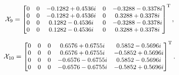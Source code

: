 \documentclass[journal]{IEEEtran}
\begin{document}
\begin{equation}
  \footnotesize   
     \mathcal X_9=
\begin{bmatrix}
   0&  0& -0.1282 + 0.4536i&  0& -0.3288 - 0.3378i\\
   0&  0& -0.1282 + 0.4536i&  0&  0.3288 + 0.3378i\\
   0&  0&  0.1282 - 0.4536i&  0& -0.3288 - 0.3378i\\
   0&  0&  0.1282 - 0.4536i&  0&  0.3288 + 0.3378i\\
      \end{bmatrix}^{\text{T}}, \notag
  \end{equation}
    
\begin{equation}
  \footnotesize   
     \mathcal X_{10}=
\begin{bmatrix}
   0&  0&  0&  0.6576 + 0.6755i&  0.5852 - 0.5696i\\
   0&  0&  0&  0.6576 + 0.6755i& -0.5852 + 0.5696i\\
   0&  0&  0& -0.6576 - 0.6755i&  0.5852 - 0.5696i\\
   0&  0&  0& -0.6576 - 0.6755i& -0.5852 + 0.5696i\\
      \end{bmatrix}^{\text{T}}. \notag
  \end{equation}
  
  
  
  
\end{document}
